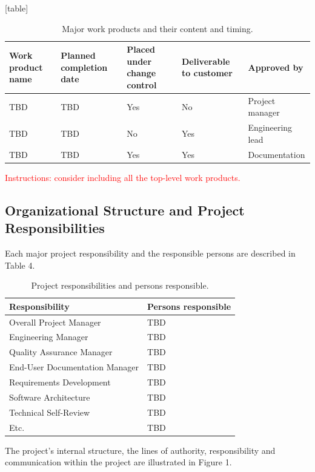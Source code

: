 \documentclass{article}
\begin{document}
[table]
\begin{table}[h]
\centering
\caption{ Major work products and their content and timing.}
\label{tab:work_product_status}
\begin{tabular}{|p{2cm}|p{2cm}|p{2cm}|p{2cm}|p{2.2cm}|}
\hline
\textbf{Work product name} & \textbf{Planned completion date} & \textbf{Placed under change control} & \textbf{Deliverable to customer} & \textbf{Approved by} \\
\hline
TBD & TBD & Yes & No & Project manager  \\
\hline
 TBD & TBD & No & Yes & Engineering lead  \\
\hline
 TBD & TBD & Yes & Yes & Documentation  \\
\hline
\end{tabular}
\end{table}

\textcolor{red}{Instructions: consider including all the top-level work products.}

\subsection{Organizational Structure and Project Responsibilities}
Each major project responsibility and the responsible persons are described in
Table 4.

\begin{table}[h]
\centering
\caption{Project responsibilities and persons responsible.}
\label{tab:project_responsibilities}
\begin{tabular}{|l|l|}
\hline
\textbf{Responsibility} & \textbf{Persons responsible} \\
\hline
Overall Project Manager & TBD \\
\hline
Engineering Manager & TBD \\
\hline
Quality Assurance Manager & TBD \\
\hline
End-User Documentation Manager & TBD \\
\hline
Requirements Development & TBD \\
\hline
Software Architecture & TBD \\
\hline
Technical Self-Review & TBD \\
\hline
Etc. & TBD \\
\hline
\end{tabular}
\end{table}



The project’s internal structure, the lines of authority, responsibility and
communication within the project are illustrated in Figure 1.
\end{document}
